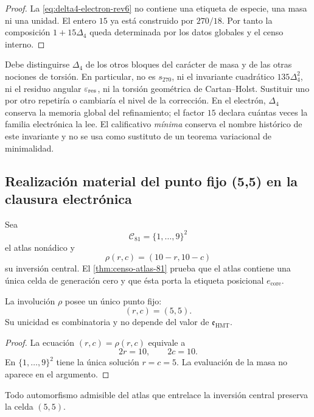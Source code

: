 \begin{proof}
La \cref{eq:delta4-electron-rev6} no contiene una etiqueta de especie, una
masa ni una unidad. El entero \(15\) ya está construido por \(270/18\).
Por tanto la composición \(1+15\Delta_4\) queda determinada por los datos
globales y el censo interno.
\end{proof}

Debe distinguirse \(\Delta_4\) de los otros bloques del carácter de masa y de
las otras nociones de torsión. En particular, no es \(s_{270}\), ni el
invariante cuadrático \(135\Delta_4^2\), ni el residuo angular
\(\varepsilon_{\rm res}\), ni la torsión geométrica de Cartan--Holst.
Sustituir uno por otro repetiría o cambiaría el nivel de la corrección. En el
electrón, \(\Delta_4\) conserva la memoria global del refinamiento; el factor
\(15\) declara cuántas veces la familia electrónica la lee. El calificativo
\emph{mínima} conserva el nombre histórico de este invariante y no se usa
como sustituto de un teorema variacional de minimalidad.

\subsection{Realización material del punto fijo (5,5) en la clausura electrónica}

Sea
\[
 \mathcal C_{81}=\{1,\ldots,9\}^2
\]
el atlas nonádico y
\[
 \rho(r,c)=(10-r,10-c)
\]
su inversión central. El \cref{thm:censo-atlas-81} prueba que el atlas
contiene una única celda de generación cero y que ésta porta la etiqueta
posicional \(e_{\mathrm{core}}\).

\begin{proposition}
\label{prop:centro-electron-rev6}
La involución \(\rho\) posee un único punto fijo:
\[
 \boxed{(r,c)=(5,5).}
\]
Su unicidad es combinatoria y no depende del valor de
\(\mathfrak e_{\mathrm{HMT}}\).
\end{proposition}

\begin{proof}
La ecuación \((r,c)=\rho(r,c)\) equivale a
\[
 2r=10,\qquad2c=10.
\]
En \(\{1,\ldots,9\}^2\) tiene la única solución \(r=c=5\). La evaluación
de la masa no aparece en el argumento.
\end{proof}

\begin{corollary}
\label{cor:universalidad-electron-central-rev6}
Todo automorfismo admisible del atlas que entrelace la inversión central
preserva la celda \((5,5)\).
\end{corollary}

